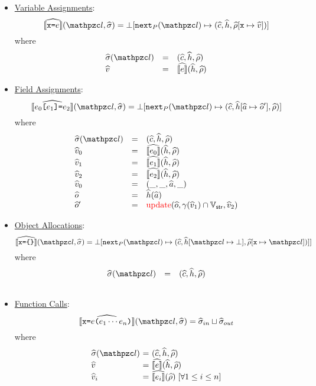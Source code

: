 \begin{itemize}
  \item \underline{Variable Assignments}:
    \[
      \asem{\varx \kweq \expr}(\lab, \astate) =
      \bot[\getnext{\prog}(\lab) \mapsto (\actxt, \aheap, \aenv[\varx \mapsto \aval])]
    \]
    where
    \[
      \begin{array}{lcl}
        \astate(\lab) &=& (\actxt, \aheap, \aenv)\\
        \aval &=& \asem{\expr}(\aheap, \aenv)\\
      \end{array}
    \]

  \item \underline{Field Assignments}:
    \[
      \asem{\expr_0 \kwsl \expr_1 \kwsr \kweq \expr_2}
      (\lab, \astate) =
      \bot[\getnext{\prog}(\lab) \mapsto (\actxt, \aheap[\aaddr \mapsto \aobj'], \aenv)]
    \]
    where
    \[
      \begin{array}{lcl}
        \astate(\lab) &=& (\actxt, \aheap, \aenv)\\
        \aval_0 &=& \asem{\expr_0}(\aheap, \aenv)\\
        \aval_1 &=& \asem{\expr_1}(\aheap, \aenv)\\
        \aval_2 &=& \asem{\expr_2}(\aheap, \aenv)\\
        \aval_0 &=& (\_, \_, \aaddr, \_)\\
        \aobj &=& \aheap(\aaddr)\\
        \aobj' &=& \inred{\text{update}}(\aobj, \gamma(\aval_1) \cap \strset, \aval_2)\\

      \end{array}
    \]

  \item \underline{Object Allocations}:
    \[
      \asem{\varx \kweq \kwcl \kwcr}(\lab, \astate) =
      \bot[\getnext{\prog}(\lab) \mapsto (
        \actxt, \aheap[\lab \mapsto \bot], \aenv[\varx \mapsto \lab]
      )]]
    \]
    where
    \[
      \begin{array}{lcl}
        \astate(\lab) &=& (\actxt, \aheap, \aenv)\\
        \
      \end{array}
    \]

  \item \underline{Function Calls}:
    \[
      \asem{\varx \kweq \expr \kwrl \expr_1 \cdots \expr_n \kwrr}(\lab, \astate) = \astate_{in} \join \astate_{out}
    \]
    where
    \newcommand{\lhs}{\bot[\lab_\func \mapsto (\actxt_\func, \aheap, \aenv_\func) \mid}
    \[
      \begin{array}{l@{~}c@{~}l}
        \astate(\lab) &=& (\actxt, \aheap, \aenv)\\
        \aval &=& \asem{\expr}(\aheap, \aenv)\\
        \aval_i &=& \asem{\expr_i}(\aenv) \; [\forall 1 \leq i \leq n]\\


\end{array}\]
\end{itemize}
